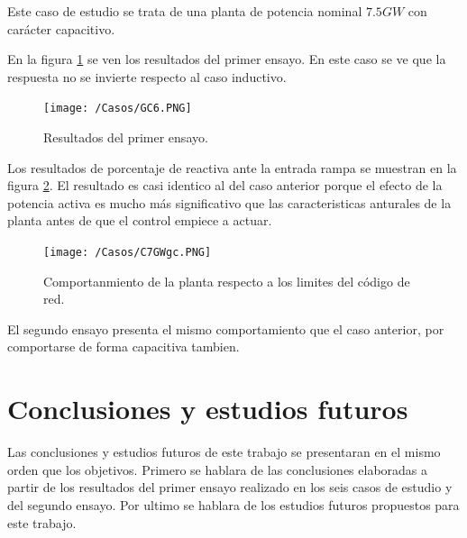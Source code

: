 \documentclass{book}
\begin{document}
Este caso de estudio se trata de una planta de potencia nominal $7.5GW$ con car\'acter capacitivo. \par

En la figura \ref{GC6} se ven los resultados del primer ensayo. En este caso se ve que la respuesta no se invierte respecto al caso inductivo.   \par

\begin{figure}[h!]
\centering
\texttt{[image: /Casos/GC6.PNG]}
\caption{Resultados del primer ensayo. }
\label{GC6}
\end{figure} \par

Los resultados de porcentaje de reactiva ante la entrada rampa se muestran en la figura \ref{C7GWgc}. El resultado es casi identico al del caso anterior porque el efecto de la potencia activa es mucho m\'as significativo que las caracteristicas anturales de la planta antes de que el control empiece a actuar. \par

\begin{figure}[h!]
\centering
\texttt{[image: /Casos/C7GWgc.PNG]}
\caption{Comportanmiento de la planta respecto a los limites del c\'odigo de red. }
\label{C7GWgc}
\end{figure} \par

El segundo ensayo presenta el mismo comportamiento que el caso anterior, por comportarse de forma capacitiva tambien. \par

\chapter{Conclusiones y estudios futuros}

Las conclusiones y estudios futuros de este trabajo se presentaran en el mismo orden que los objetivos. Primero se hablara de las conclusiones elaboradas a partir de los resultados del primer ensayo realizado en los seis casos de estudio y del segundo ensayo. Por ultimo se hablara de los estudios futuros propuestos para este trabajo.  \par
\end{document}
